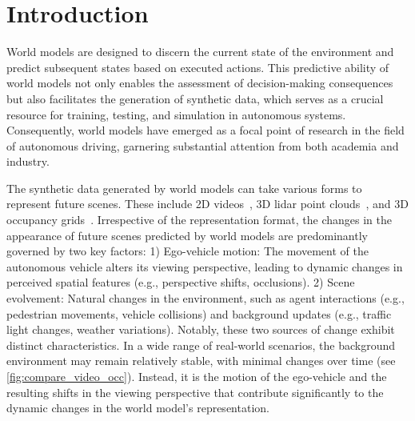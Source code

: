 \section{Introduction}\label{sec:intro}
World models are designed to discern the current state of the environment and predict subsequent states based on executed actions. 
This predictive ability of world models not only enables the assessment of decision-making consequences but also facilitates the generation of synthetic data, which serves as a crucial resource for training, testing, and simulation in autonomous systems. 
Consequently, world models have emerged as a focal point of research in the field of autonomous driving, garnering substantial attention from both academia and industry.

The synthetic data generated by world models can take various forms to represent future scenes.
These include 2D videos~\cite{hu2023gaia, uniscene, wang2024drivedreamer, wang2024driving},
3D lidar point clouds~\cite{agro2024uno, khurana2023point, uniscene, yang2024visual, zyrianov2024lidardm},
and 3D occupancy grids~\cite{occworld, occvar, dome,dfit-occworld,occ-llm, uniscene, renderworld, occllama}.
Irrespective of the representation format, the changes in the appearance of future scenes predicted by world models are predominantly governed by two key factors:
1) Ego-vehicle motion: The movement of the autonomous vehicle alters its viewing perspective, leading to dynamic changes in perceived spatial features (e.g., perspective shifts, occlusions).
2) Scene evolvement: Natural changes in the environment, such as agent interactions (e.g., pedestrian movements, vehicle collisions) and background updates (e.g., traffic light changes, weather variations).
Notably, these two sources of change exhibit distinct characteristics. In a wide range of real-world scenarios, the background environment may remain relatively stable, with minimal changes over time (see \cref{fig:compare_video_occ}).
Instead, it is the motion of the ego-vehicle and the resulting shifts in the viewing perspective that contribute significantly to the dynamic changes in the world model's representation.

